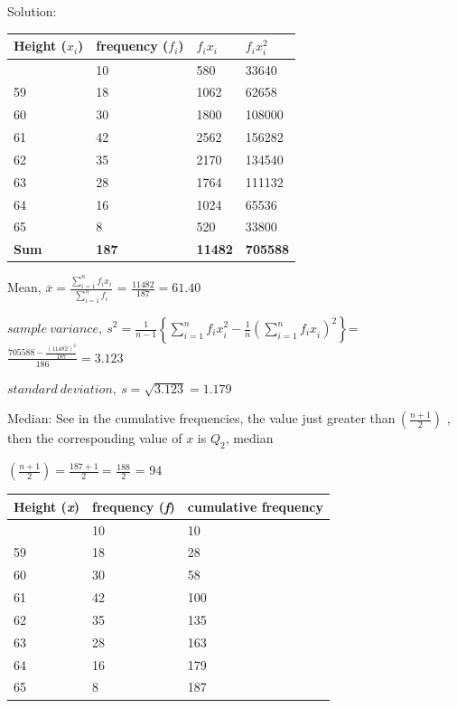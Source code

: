 \documentclass[
]{book}
\begin{document}
Solution:

\begin{longtable}[]{@{}llll@{}}
\toprule\noalign{}
Height (\(x_{i}\)) & frequency (\(f_{i}\)) & \(f_{i}x_{i}\) & \(f_{i}x_{i}^{2}\) \\
\midrule\noalign{}
\endhead
\bottomrule\noalign{}
\endlastfoot
58 & 10 & 580 & 33640 \\
59 & 18 & 1062 & 62658 \\
60 & 30 & 1800 & 108000 \\
61 & 42 & 2562 & 156282 \\
62 & 35 & 2170 & 134540 \\
63 & 28 & 1764 & 111132 \\
64 & 16 & 1024 & 65536 \\
65 & 8 & 520 & 33800 \\
\textbf{Sum} & \textbf{187} & \textbf{11482} & \textbf{705588} \\
\end{longtable}

Mean,
\(\overline{x} = \frac{\sum_{i = 1}^{n}{f_{i}x_{i}}}{\sum_{i = 1}^{n}f_{i}}\)
= \(\frac{11482}{187} = 61.40\)

\({sample\ variance,\ s}^{2} = \frac{1}{n - 1}\left\{ \sum_{i = 1}^{n}{{f_{i}x}_{i}^{2} - \frac{1}{n}}\left( \sum_{i = 1}^{n}{f_{i}x}_{i} \right)^{2} \right\}\)=
\(\frac{705588 - \frac{\left( 11482 \right)^{2}}{187}}{186} = 3.123\)

\(standard\ deviation,\ s = \sqrt{3.123} = 1.179\)

Median: See in the cumulative frequencies, the value just greater
than\(\ \left( \frac{n + 1}{2} \right)\) , then the corresponding value of
\(x\) is \(Q_{2}\), median

\(\left( \frac{n + 1}{2} \right) = \frac{187 + 1}{2}\ \)= \(\frac{188}{2}\)
= 94

\begin{longtable}[]{@{}lll@{}}
\toprule\noalign{}
Height (\emph{x}) & frequency (\emph{f}) & cumulative frequency \\
\midrule\noalign{}
\endhead
\bottomrule\noalign{}
\endlastfoot
58 & 10 & 10 \\
59 & 18 & 28 \\
60 & 30 & 58 \\
61 & 42 & 100 \\
62 & 35 & 135 \\
63 & 28 & 163 \\
64 & 16 & 179 \\
65 & 8 & 187 \\
\end{longtable}
\end{document}
